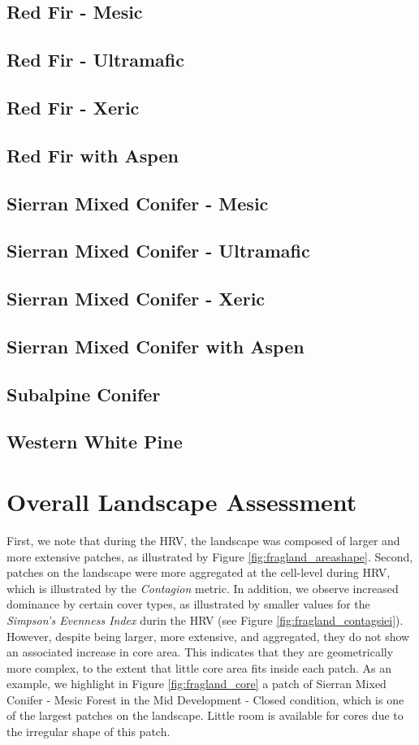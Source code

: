 \subsection{Red Fir - Mesic} 
\subsection{Red Fir - Ultramafic} 
\subsection{Red Fir - Xeric} 
\subsection{Red Fir with Aspen} 
\subsection{Sierran Mixed Conifer - Mesic} 
\subsection{Sierran Mixed Conifer - Ultramafic} 
\subsection{Sierran Mixed Conifer - Xeric} 
\subsection{Sierran Mixed Conifer with Aspen} 
\subsection{Subalpine Conifer} 
\subsection{Western White Pine} 



\section{Overall Landscape Assessment}

First, we note that during the HRV, the landscape was composed of larger and more extensive patches, as illustrated by Figure \ref{fig:fragland_areashape}. 
Second, patches on the landscape were more aggregated at the cell-level during HRV, which is illustrated by the \emph{Contagion} metric. In addition, we observe increased dominance by certain cover types, as illustrated by smaller values for the \emph{Simpson's Evenness Index} durin the HRV (see Figure \ref{fig:fragland_contagsiei}). However, despite being larger, more extensive, and aggregated, they do not show an associated increase in core area. This indicates that they are geometrically more complex, to the extent that little core area fits inside each patch. As an example, we highlight in Figure \ref{fig:fragland_core} a patch of Sierran Mixed Conifer - Mesic Forest in the Mid Development - Closed condition, which is one of the largest patches on the landscape. Little room is available for cores due to the irregular shape of this patch.

